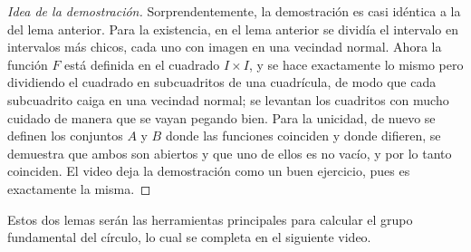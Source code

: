 \documentclass[11pt]{article}
\begin{document}
\begin{proof}[Idea de la demostración]
Sorprendentemente, la demostración es casi idéntica a la del lema anterior. Para la existencia, en el lema anterior se dividía el intervalo en intervalos más chicos, cada uno con imagen en una vecindad normal. Ahora la función $F$ está definida en el cuadrado $I\times I$, y se hace exactamente lo mismo pero dividiendo el cuadrado en subcuadritos de una cuadrícula, de modo que cada subcuadrito caiga en una vecindad normal; se levantan los cuadritos con mucho cuidado de manera que se vayan pegando bien. Para la unicidad, de nuevo se definen los conjuntos $A$ y $B$ donde las funciones coinciden y donde difieren, se demuestra que ambos son abiertos y que uno de ellos es no vacío, y por lo tanto coinciden. El video deja la demostración como un buen ejercicio, pues es exactamente la misma.
\end{proof}

Estos dos lemas serán las herramientas principales para calcular el grupo fundamental del círculo, lo cual se completa en el siguiente video.
\end{document}
